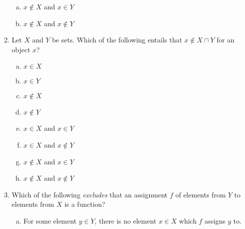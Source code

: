 \begin{enumerate}[\thesection.1]
\begin{minipage}{.5\linewidth}
\begin{enumerate}[(a)]
			\item $x\notin X$ and $x\in Y$
			
			\item $x\notin X$ and $x\notin Y$			
					
		\end{enumerate}
		\end{minipage}
		
		\item Let $X$ and $Y$ be sets. Which of the following entails that $x\notin X\cap Y$ for an object $x$?
		
		\begin{minipage}{.5\linewidth}
			\begin{enumerate}[(a)]
		
			\item $x\in X$
			
			\item $x\in Y$			
			
			\item $x\notin X$
			
			\item $x\notin Y$
		\end{enumerate}
		\end{minipage}
		\begin{minipage}{.5\linewidth}
		\begin{enumerate}[(a)]
		\setcounter{enumii}{4}
			
			\item $x\in X$ and $x\in Y$
		
			\item $x\in X$ and $x\notin Y$
			
			\item $x\notin X$ and $x\in Y$
			
			\item $x\notin X$ and $x\notin Y$			
					
		\end{enumerate}
		\end{minipage}
		
	\item Which of the following \emph{excludes} that an assignment $f$ of elements from $Y$ to elements from $X$ is a function?
	
	\begin{enumerate}[(a)]
		
		\item For some element $y\in Y$, there is no element $x\in X$ which $f$ assigns $y$ to.
		

\end{enumerate}
\end{enumerate}
